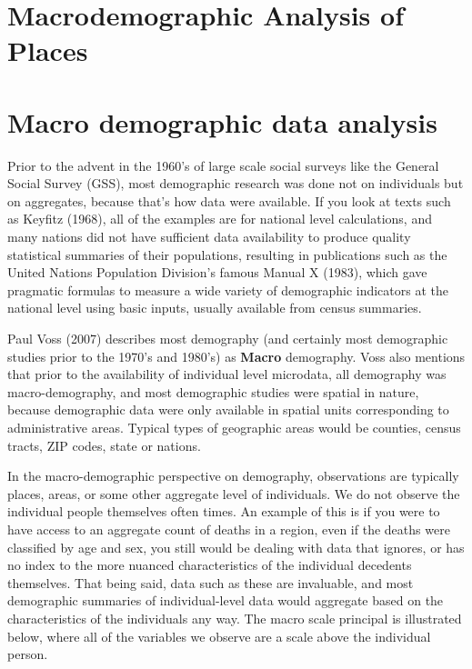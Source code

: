 \documentclass[
  letterpaper,
  DIV=11,
  numbers=noendperiod]{scrreprt}
\begin{document}

\hypertarget{macrodemographic-analysis-of-places}{%
\chapter{Macrodemographic Analysis of
Places}\label{macrodemographic-analysis-of-places}}

\newpage


\hypertarget{macro-demographic-data-analysis}{%
\chapter{Macro demographic data
analysis}\label{macro-demographic-data-analysis}}

Prior to the advent in the 1960's of large scale social surveys like the
General Social Survey (GSS), most demographic research was done not on
individuals but on aggregates, because that's how data were available.
If you look at texts such as Keyfitz (1968), all of the examples are for
national level calculations, and many nations did not have sufficient
data availability to produce quality statistical summaries of their
populations, resulting in publications such as the United Nations
Population Division's famous Manual X (1983), which gave pragmatic
formulas to measure a wide variety of demographic indicators at the
national level using basic inputs, usually available from census
summaries.

Paul Voss (2007) describes most demography (and certainly most
demographic studies prior to the 1970's and 1980's) as \textbf{Macro}
demography. Voss also mentions that prior to the availability of
individual level microdata, all demography was macro-demography, and
most demographic studies were spatial in nature, because demographic
data were only available in spatial units corresponding to
administrative areas. Typical types of geographic areas would be
counties, census tracts, ZIP codes, state or nations.

In the macro-demographic perspective on demography, observations are
typically places, areas, or some other aggregate level of individuals.
We do not observe the individual people themselves often times. An
example of this is if you were to have access to an aggregate count of
deaths in a region, even if the deaths were classified by age and sex,
you still would be dealing with data that ignores, or has no index to
the more nuanced characteristics of the individual decedents themselves.
That being said, data such as these are invaluable, and most demographic
summaries of individual-level data would aggregate based on the
characteristics of the individuals any way. The macro scale principal is
illustrated below, where all of the variables we observe are a scale
above the individual person.
\end{document}
